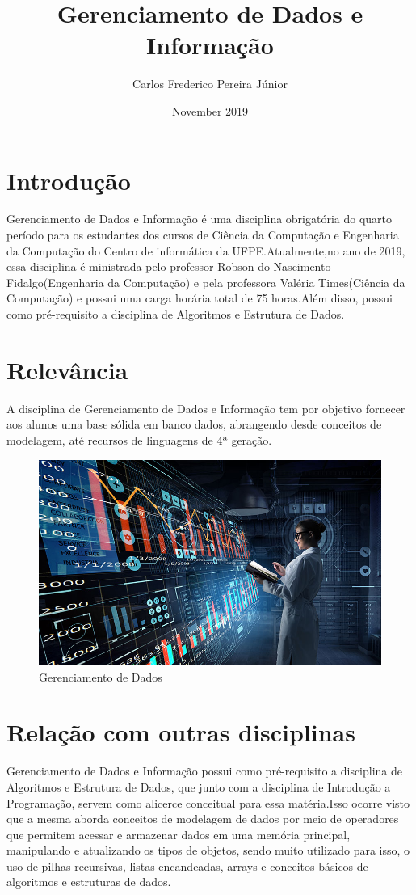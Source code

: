 \documentclass{article}
\title{Gerenciamento de Dados e Informação}
\author{Carlos Frederico Pereira Júnior }
\date{November 2019}
\begin{document}
\maketitle

\section{Introdução}
Gerenciamento de Dados e Informação é uma disciplina obrigatória do quarto período para os estudantes dos cursos de Ciência da Computação e Engenharia da Computação do Centro de informática da UFPE.Atualmente,no ano de 2019, essa disciplina é ministrada pelo professor Robson do Nascimento Fidalgo(Engenharia da Computação) e pela professora Valéria Times(Ciência da Computação) e possui uma carga horária total de 75 horas.Além disso, possui como pré-requisito a disciplina de Algoritmos e Estrutura de Dados.\cite{sitedadisciplina}

\section{Relevância}
A disciplina de Gerenciamento de Dados e Informação tem por objetivo fornecer aos alunos uma base sólida em banco dados, abrangendo desde conceitos de modelagem, até recursos de linguagens de 4ª geração.\cite{if685}

\begin{figure}[h!]
\centering
\includegraphics[scale=0.3]{cientista.jpg}
\caption{Gerenciamento de Dados \cite{gerenciamentodedados}}
\label{fig:Gerenciamento de Dados}
\end{figure}

\section{Relação com outras disciplinas}
Gerenciamento de Dados e Informação possui como pré-requisito a disciplina de Algoritmos e Estrutura de Dados, que junto com a disciplina de Introdução a Programação, servem como alicerce conceitual para essa matéria.Isso ocorre visto que a mesma aborda conceitos de modelagem de dados por meio de operadores que permitem acessar e armazenar dados em uma memória principal, manipulando e atualizando os tipos de objetos, sendo muito utilizado para isso, o uso de pilhas recursivas, listas encandeadas, arrays e conceitos básicos de algoritmos e estruturas de dados.







\end{document}
